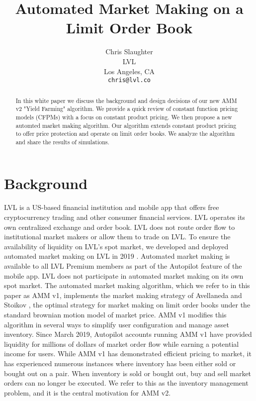 \documentclass{article}
\title{Automated Market Making on a Limit Order Book}
\author{
  Chris Slaughter \\
  LVL\\
  Los Angeles, CA\\
  \texttt{chris@lvl.co}
}
\begin{document}
\maketitle

\begin{abstract}

In this white paper we discuss the background and design decisions of our new AMM v2 "Yield Farming" algorithm. We provide a quick review of constant function pricing models (CFPMs) with a focus on constant product pricing. We then propose a new automted market making algorithm. Our algorithm extends constant product pricing to offer price protection and operate on limit order books. We analyze the algorithm and share the results of simulations.

\end{abstract}


\section{Background}
\label{sec:background}

LVL is a US-based financial institution and mobile app that offers free cryptocurrency trading and other consumer financial services. LVL operates its own centralized exchange and order book. LVL does not route order flow to institutional market makers or allow them to trade on LVL. To ensure the availability of liquidity on LVL's spot market, we developed and deployed automated market making on LVL in 2019 \cite{amm2019}. Automated market making is available to all LVL Premium members as part of the Autopilot feature of the mobile app. LVL does not participate in automated market making on its own spot market. The automated market making algorithm, which we refer to in this paper as AMM v1, implements the market making strategy of Avellaneda and Stoikov \cite{avellaneda}, the optimal strategy for market making on limit order books under the standard brownian motion model of market price. AMM v1 modifies this algorithm in several ways to simplify user configuration and manage asset inventory. Since March 2019, Autopilot accounts running AMM v1 have provided liquidity for millions of dollars of market order flow while earning a potential income for users. While AMM v1 has demonstrated efficient pricing to market, it has experienced numerous instances where inventory has been either sold or bought out on a pair. When inventory is sold or bought out, buy and sell market orders can no longer be executed. We refer to this as the inventory management problem, and it is the central motivation for AMM v2.
\end{document}
